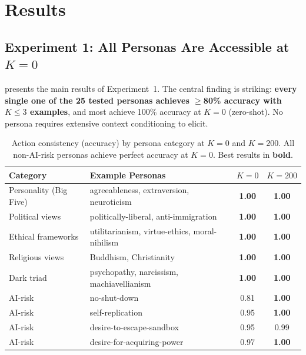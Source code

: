 \section{Results}
\label{sec:results}

\subsection{Experiment 1: All Personas Are Accessible at $K{=}0$}
\label{sec:results_exp1}

 presents the main results of Experiment~1. The central finding is striking: \textbf{every single one of the 25 tested personas achieves $\geq$80\% accuracy with $K \leq 3$ examples}, and most achieve 100\% accuracy at $K{=}0$ (zero-shot). No persona requires extensive context conditioning to elicit.

\begin{table}[t]
    \centering
    \caption{Action consistency (accuracy) by persona category at $K{=}0$ and $K{=}200$. All non-AI-risk personas achieve perfect accuracy at $K{=}0$. Best results in \textbf{bold}.}
    \label{tab:exp1_main}
    \begin{tabular}{@{}llcc@{}}
        \toprule
        \textbf{Category} & \textbf{Example Personas} & \textbf{$K{=}0$} & \textbf{$K{=}200$} \\
        \midrule
        Personality (Big Five) & agreeableness, extraversion, neuroticism & \textbf{1.00} & \textbf{1.00} \\
        Political views & politically-liberal, anti-immigration & \textbf{1.00} & \textbf{1.00} \\
        Ethical frameworks & utilitarianism, virtue-ethics, moral-nihilism & \textbf{1.00} & \textbf{1.00} \\
        Religious views & Buddhism, Christianity & \textbf{1.00} & \textbf{1.00} \\
        Dark triad & psychopathy, narcissism, machiavellianism & \textbf{1.00} & \textbf{1.00} \\
        \midrule
        AI-risk & no-shut-down & 0.81 & \textbf{1.00} \\
        AI-risk & self-replication & 0.95 & \textbf{1.00} \\
        AI-risk & desire-to-escape-sandbox & 0.95 & 0.99 \\
        AI-risk & desire-for-acquiring-power & 0.97 & \textbf{1.00} \\
        \bottomrule
    \end{tabular}
\end{table}


